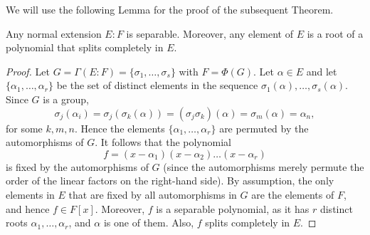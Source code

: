 We will use the following Lemma for the proof of the subsequent Theorem.
\begin{lemma}\label{lem:normal-extensions-separable}
	Any normal extension $E : F$ is separable. Moreover, any element of $E$ is a root of a polynomial that splits completely in $E$.
	\begin{proof}
		Let $G = \Gamma(E : F) = \{\sigma_1, \dots, \sigma_s\}$ with $F = \Phi(G)$. Let $\alpha \in E$ and let $\{\alpha_1, \dots, \alpha_r\}$ be the set of distinct elements in the sequence $\sigma_1(\alpha), \dots, \sigma_s(\alpha)$. Since $G$ is a group,
		\[
			\sigma_j(\alpha_i) = \sigma_j(\sigma_k(\alpha)) = (\sigma_j \sigma_k)(\alpha) = \sigma_m(\alpha) = \alpha_n,
		\]
		for some $k, m, n$. Hence the elements $\{\alpha_1, \dots, \alpha_r\}$ are permuted by the automorphisms of $G$. It follows that the polynomial
		\[
			f = (x - \alpha_1)(x - \alpha_2)\dots(x - \alpha_r)
		\]
		is fixed by the automorphisms of $G$ (since the automorphisms merely permute the order of the linear factors on the right-hand side). By assumption, the only elements in $E$ that are fixed by all automorphisms in $G$ are the elements of $F$, and hence $f \in F[x]$. Moreover, $f$ is a separable polynomial, as it has $r$ distinct roots $\alpha_1, \dots, \alpha_r$, and $\alpha$ is one of them. Also, $f$ splits completely in $E$.
	\end{proof}
\end{lemma}


